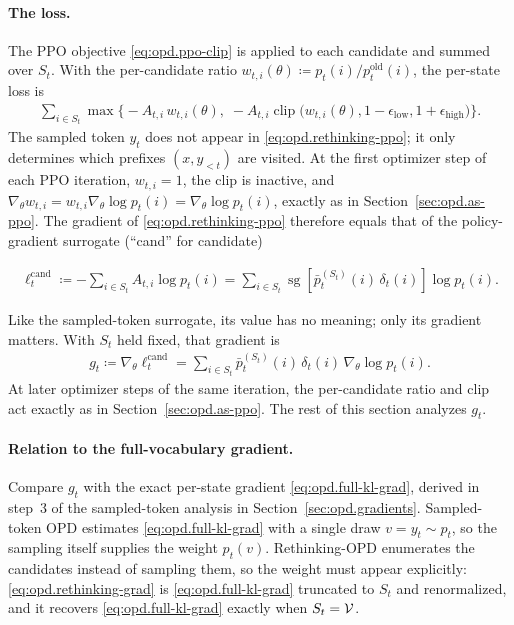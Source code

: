 \paragraph{The loss.}
The PPO objective \eqref{eq:opd.ppo-clip} is applied to each candidate and summed over
$S_t$. With the per-candidate ratio $w_{t,i}(\theta)\coloneqq p_t(i)/p_t^{\mathrm{old}}(i)$, the
per-state loss is
\begin{align}
    \sum_{i\in S_t}
    \max\!\Big\{
        -A_{t,i}\,w_{t,i}(\theta),\;
        -A_{t,i}\operatorname{clip}\!\big(w_{t,i}(\theta),1-\epsilon_{\mathrm{low}},1+\epsilon_{\mathrm{high}}\big)
    \Big\}.
    \label{eq:opd.rethinking-ppo}
\end{align}
The sampled token $y_t$ does not appear in \eqref{eq:opd.rethinking-ppo}; it only determines
which prefixes $(x,y_{<t})$ are visited. At the first optimizer step of each PPO iteration,
$w_{t,i}=1$, the clip is inactive, and $\nabla_\theta w_{t,i}=w_{t,i}\nabla_\theta\log p_t(i)=\nabla_\theta\log p_t(i)$,
exactly as in Section~\ref{sec:opd.as-ppo}. The gradient of \eqref{eq:opd.rethinking-ppo}
therefore equals that of the policy-gradient surrogate (``cand'' for candidate)
\begin{highlight}
    \begin{align}
        \ell_t^{\mathrm{cand}}
        \coloneqq
        -\sum_{i\in S_t}A_{t,i}\log p_t(i)
        =
        \sum_{i\in S_t}
        \operatorname{sg}\!\left[
            \bar p_t^{(S_t)}(i)\,\delta_t(i)
        \right]
        \log p_t(i).
        \label{eq:opd.rethinking-loss}
    \end{align}
\end{highlight}
Like the sampled-token surrogate, its value has no meaning; only its gradient matters.
With $S_t$ held fixed, that gradient is
\begin{align}
    g_t
    \coloneqq
    \nabla_\theta\ell_t^{\mathrm{cand}}
    =
    \sum_{i\in S_t}
    \bar p_t^{(S_t)}(i)\,\delta_t(i)\,\nabla_\theta\log p_t(i).
    \label{eq:opd.rethinking-grad}
\end{align}
At later optimizer steps of the same iteration, the per-candidate ratio and clip act
exactly as in Section~\ref{sec:opd.as-ppo}. The rest of this section analyzes $g_t$.

\paragraph{Relation to the full-vocabulary gradient.}
Compare $g_t$ with the exact per-state gradient \eqref{eq:opd.full-kl-grad}, derived in
step~3 of the sampled-token analysis in Section~\ref{sec:opd.gradients}. Sampled-token OPD estimates \eqref{eq:opd.full-kl-grad} with a single draw
$v=y_t\sim p_t$, so the sampling itself supplies the weight $p_t(v)$. Rethinking-OPD
enumerates the candidates instead of sampling them, so the weight must appear
explicitly: \eqref{eq:opd.rethinking-grad} is \eqref{eq:opd.full-kl-grad} truncated
to $S_t$ and renormalized, and it recovers \eqref{eq:opd.full-kl-grad} exactly when
$S_t={\cal V}$.

